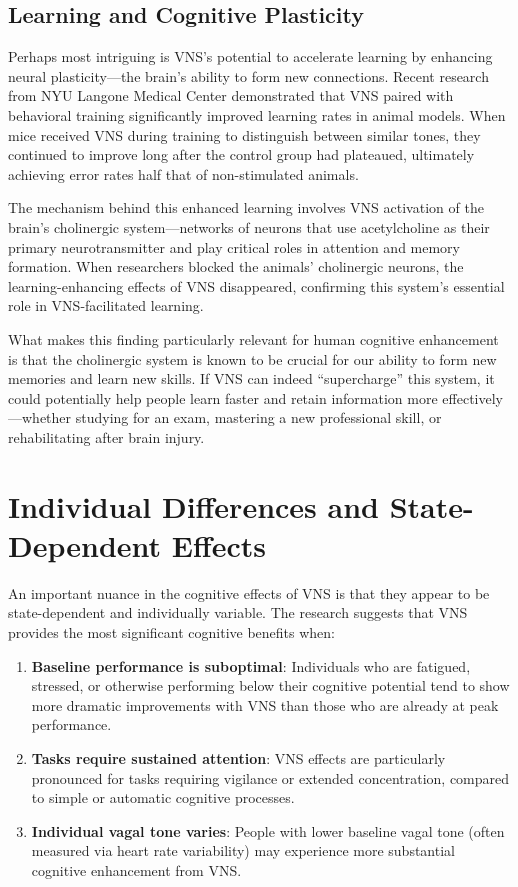 \documentclass[
  Letterpaper,
]{scrbook}
\begin{document}
\subsection{Learning and Cognitive
Plasticity}\label{learning-and-cognitive-plasticity}

Perhaps most intriguing is VNS's potential to accelerate learning by
enhancing neural plasticity---the brain's ability to form new
connections. Recent research from NYU Langone Medical Center
demonstrated that VNS paired with behavioral training significantly
improved learning rates in animal models. When mice received VNS during
training to distinguish between similar tones, they continued to improve
long after the control group had plateaued, ultimately achieving error
rates half that of non-stimulated animals.

The mechanism behind this enhanced learning involves VNS activation of
the brain's cholinergic system---networks of neurons that use
acetylcholine as their primary neurotransmitter and play critical roles
in attention and memory formation. When researchers blocked the animals'
cholinergic neurons, the learning-enhancing effects of VNS disappeared,
confirming this system's essential role in VNS-facilitated learning.

What makes this finding particularly relevant for human cognitive
enhancement is that the cholinergic system is known to be crucial for
our ability to form new memories and learn new skills. If VNS can indeed
``supercharge'' this system, it could potentially help people learn
faster and retain information more effectively---whether studying for an
exam, mastering a new professional skill, or rehabilitating after brain
injury.

\section{Individual Differences and State-Dependent
Effects}\label{individual-differences-and-state-dependent-effects}

An important nuance in the cognitive effects of VNS is that they appear
to be state-dependent and individually variable. The research suggests
that VNS provides the most significant cognitive benefits when:

\begin{enumerate}
\def\labelenumi{\arabic{enumi}.}
\item
  \textbf{Baseline performance is suboptimal}: Individuals who are
  fatigued, stressed, or otherwise performing below their cognitive
  potential tend to show more dramatic improvements with VNS than those
  who are already at peak performance.
\item
  \textbf{Tasks require sustained attention}: VNS effects are
  particularly pronounced for tasks requiring vigilance or extended
  concentration, compared to simple or automatic cognitive processes.
\item
  \textbf{Individual vagal tone varies}: People with lower baseline
  vagal tone (often measured via heart rate variability) may experience
  more substantial cognitive enhancement from VNS.
\end{enumerate}
\end{document}
